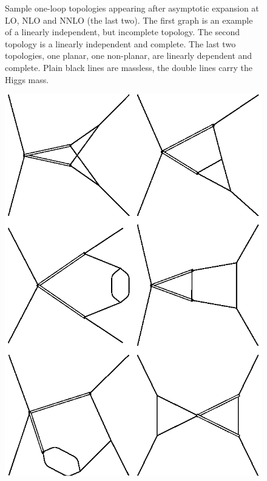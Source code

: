 \documentclass{article}
\begin{document}
\begin{figure}
  \caption{%
    Sample one-loop topologies appearing after asymptotic expansion at
    LO, NLO and NNLO (the last two).  The first graph is an example of a
    linearly independent, but incomplete topology.  The second topology
    is a linearly independent and complete.  The last two topologies,
    one planar, one non-planar, are linearly dependent and complete.
    Plain black lines are massless, the double lines carry the Higgs
    mass.}
  \label{fig::top-type}
\end{figure}

\begin{figure}
  \centering
  \includegraphics[scale=0.6]{NNLOgv22.gtops.eps}\hspace*{3.5pc}

\end{figure}
\end{document}
